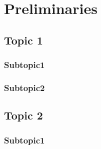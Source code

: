 \chapter{Preliminaries}

\section{Topic 1}

\subsection{Subtopic1}

\subsection{Subtopic2}

\section{Topic 2}

\subsection{Subtopic1}